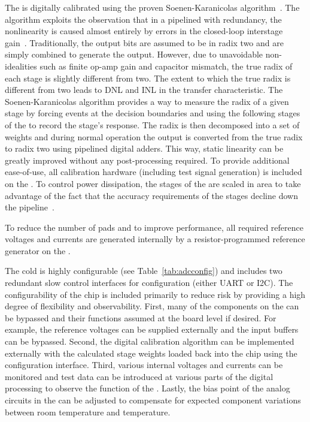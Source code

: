 The  is digitally calibrated using the proven Soenen-Karanicolas algorithm~\cite{280084,372864}. The algorithm exploits the observation that in a pipelined  with redundancy, the  nonlinearity is caused almost entirely by errors in the closed-loop interstage gain~\cite{121557}. Traditionally, the  output bits are assumed to be in radix two and are simply combined to generate the  output. However, due to unavoidable non-idealities such as finite op-amp gain and capacitor mismatch, the true radix of each stage is slightly different from two. The extent to which the true radix is different from two leads to DNL and INL in the  transfer characteristic. The Soenen-Karanicolas algorithm provides a way to measure the radix of a given stage by forcing events at the decision boundaries and using the following stages of the  to record the stage's response. The radix is then decomposed into a set of weights and during normal operation the  output is converted from the true radix to radix two using pipelined digital adders. This way, static linearity can be greatly improved without any post-processing required. To provide additional ease-of-use, all calibration hardware (including test signal generation) is included on the  . To control power dissipation, the stages of the  are scaled in area to take advantage of the fact that the accuracy requirements of the stages decline down the pipeline~\cite{494191}.

To reduce the number of pads and to improve performance, all required reference voltages and currents are generated internally by a resistor-programmed reference generator on the .

The cold  is highly configurable (see Table~\ref{tab:adcconfig}) and includes two redundant slow control interfaces for configuration (either UART or I2C). The configurability of the chip is included primarily to reduce risk by providing a high degree of flexibility and observability. First, many of the components on the  can be bypassed and their functions assumed at the board level if desired. For example, the  reference voltages can be supplied externally and the input buffers can be bypassed. Second, the  digital calibration algorithm can be implemented externally with the calculated stage weights loaded back into the chip using the configuration interface. Third, various internal voltages and currents can be monitored and test data can be introduced at various parts of the digital processing to observe the function of the . Lastly, the bias point of the analog circuits in the  can be adjusted to compensate for expected component variations between room temperature and \lar temperature.

